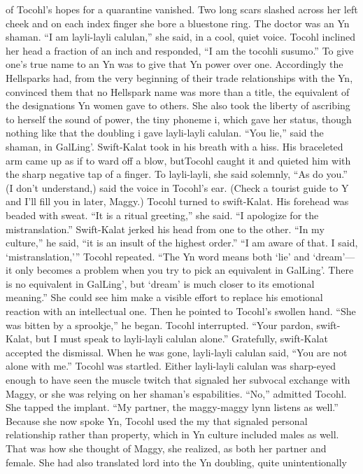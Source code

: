 \documentclass[9pt]{article}
\begin{document}
of Tocohl’s hopes for a quarantine vanished. Two long scars slashed across her left cheek and on each
index finger she bore a bluestone ring. The doctor was an Yn shaman.
“I am layli-layli calulan,” she said, in a cool, quiet voice.
Tocohl inclined her head a fraction of an inch and responded, “I am the tocohli susumo.” To give
one’s true name to an Yn was to give that Yn power over one. Accordingly the Hellsparks had, from the
very beginning of their trade relationships with the Yn, convinced them that no Hellspark name was more
than a title, the equivalent of the designations Yn women gave to others. She also took the liberty of
ascribing to herself the sound of power, the tiny phoneme i, which gave her status, though nothing like
that the doubling i gave layli-layli calulan.
“You lie,” said the shaman, in GalLing’.
Swift-Kalat took in his breath with a hiss. His braceleted arm came up as if to ward off a blow, butTocohl caught it and quieted him with the sharp negative tap of a finger.
To layli-layli, she said solemnly, “As do you.”
(I don’t understand,) said the voice in Tocohl’s ear.
(Check a tourist guide to Y and I’ll fill you in later, Maggy.)
Tocohl turned to swift-Kalat. His forehead was beaded with sweat. “It is a ritual greeting,” she said.
“I apologize for the mistranslation.”
Swift-Kalat jerked his head from one to the other. “In my culture,” he said, “it is an insult of the
highest order.”
“I am aware of that. I said, ‘mistranslation,’” Tocohl repeated. “The Yn word means both ‘lie’ and
‘dream’—it only becomes a problem when you try to pick an equivalent in GalLing’. There is no
equivalent in GalLing’, but ‘dream’ is much closer to its emotional meaning.”
She could see him make a visible effort to replace his emotional reaction with an intellectual one.
Then he pointed to Tocohl’s swollen hand. “She was bitten by a sprookje,” he began.
Tocohl interrupted. “Your pardon, swift-Kalat, but I must speak to layli-layli calulan alone.”
Gratefully, swift-Kalat accepted the dismissal.
When he was gone, layli-layli calulan said, “You are not alone with me.”
Tocohl was startled. Either layli-layli calulan was sharp-eyed enough to have seen the muscle
twitch that signaled her subvocal exchange with Maggy, or she was relying on her shaman’s espabilities.
“No,” admitted Tocohl. She tapped the implant. “My partner, the maggy-maggy lynn listens as
well.”
Because she now spoke Yn, Tocohl used the my that signaled personal relationship rather than
property, which in Yn culture included males as well. That was how she thought of Maggy, she realized,
as both her partner and female. She had also translated lord into the Yn doubling, quite unintentionally
\end{document}
